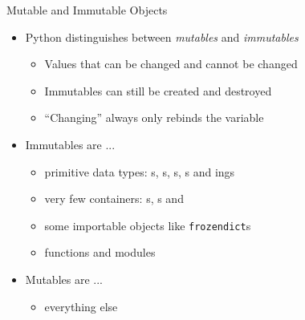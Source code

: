 \begin{frame}{Mutable and Immutable Objects}
%
\begin{itemize}
\item Python distinguishes between \emph{mutables} and \emph{immutables}
	\begin{itemize}
	\item Values that can be changed and cannot be changed
	\item Immutables can still be created and destroyed
	\item \enquote{Changing} always only rebinds the variable
	\end{itemize}
\item Immutables are ...
	\begin{itemize}
	\item primitive data types: s, s, s, s and ings
	\item very few containers: s, s and 
	\item some importable objects like \texttt{frozendict}s
	\item functions and modules
	\end{itemize}
\item Mutables are ...
	\begin{itemize}
	\item everything else
	\end{itemize}
\end{itemize}
%
\end{frame}


